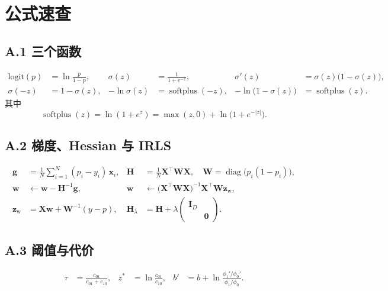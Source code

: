 \documentclass[11pt,a4paper,fontset=windows,zihao=-4]{ctexart}
\newcommand{\bX}{\mathbf{X}}
\newcommand{\bw}{\mathbf{w}}
\newcommand{\bx}{\mathbf{x}}
\newcommand{\bz}{\mathbf{z}}
\newcommand{\bg}{\mathbf{g}}
\newcommand{\bI}{\mathbf{I}}
\newcommand{\bH}{\mathbf{H}}
\newcommand{\bW}{\mathbf{W}}
\newcommand{\tp}{^{\top}}
\newcommand{\abs}[1]{\lvert #1\rvert}
\DeclareMathOperator{\diag}{diag}
\DeclareMathOperator{\softplus}{softplus}
\begin{document}

\appendix
\renewcommand{\thesection}{\Alph{section}}

\section{公式速查}

\subsection*{A.1 三个函数}
\begin{align}
  \mathrm{logit}(p)&=\ln\frac{p}{1-p}, &
  \sigma(z)&=\frac{1}{1+e^{-z}}, &
  \sigma'(z)&=\sigma(z)\bigl(1-\sigma(z)\bigr),\\
  \sigma(-z)&=1-\sigma(z), &
  -\ln\sigma(z)&=\softplus(-z), &
  -\ln\bigl(1-\sigma(z)\bigr)&=\softplus(z).
\end{align}
其中
\begin{equation}
  \softplus(z)=\ln(1+e^{z})=\max(z,0)+\ln\bigl(1+e^{-\abs{z}}\bigr).
\end{equation}

\subsection*{A.2 梯度、Hessian 与 IRLS}
\begin{align}
  \bg&=\frac1N\sum_{i=1}^{N}(p_i-y_i)\,\bx_i, &
  \bH&=\frac1N\bX\tp\bW\bX,\quad \bW=\diag\bigl(p_i(1-p_i)\bigr),\\
  \bw&\leftarrow\bw-\bH^{-1}\bg, &
  \bw&\leftarrow\bigl(\bX\tp\bW\bX\bigr)^{-1}\bX\tp\bW\bz_{\mathrm w},\\
  \bz_{\mathrm w}&=\bX\bw+\bW^{-1}(y-p), &
  \bH_{\lambda}&=\bH+\lambda\begin{pmatrix}\bI_D&\\&\mathbf{0}\end{pmatrix}.
\end{align}

\subsection*{A.3 阈值与代价}
\begin{align}
  \tau&=\frac{c_{01}}{c_{01}+c_{10}}, &
  z^{\ast}&=\ln\frac{c_{01}}{c_{10}}, &
  b'&=b+\ln\frac{\phi_1'/\phi_0'}{\phi_1/\phi_0}.
\end{align}
\end{document}

